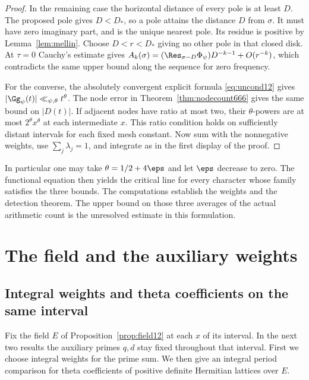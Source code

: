 \documentclass[a4paper,11pt]{article}
\theoremstyle{definition}
\theoremstyle{remark}
\numberwithin{equation}{section}
\begin{document}
\begin{proof}
In the remaining case the horizontal distance of every pole is
at least \(D\). The proposed pole gives \(D<D_*\), so a pole
attains the distance \(D\) from \(\sigma\). It must have zero
imaginary part, and is the unique nearest pole. Its residue is
positive by Lemma~\ref{lem:mellin}. Choose \(D<r<D_*\) giving
no other pole in that closed disk. At \(\tau=0\) Cauchy's
estimate gives \(A_k(\sigma)=(\Res_{\sigma-D}\Phi_\psi)D^{-k-1}
+O(r^{-k})\), which contradicts the same upper bound along the
sequence for zero frequency.

For the converse, the absolutely convergent explicit formula
\eqref{eq:uncond12} gives \(|\Gg_\psi(t)|\ll_{\psi,\theta}t^\theta\).
The node error in Theorem~\ref{thm:nodecount666} gives the same
bound on \(|D(t)|\). If adjacent nodes have ratio at most two,
their \(\theta\)-powers are at most \(2^\theta x^\theta\) at each
intermediate \(x\). This ratio condition holds on sufficiently
distant intervals for each fixed mesh constant. Now sum with the
nonnegative weights, use \(\sum_j\lambda_j=1\), and integrate
as in the first display of the proof.
\end{proof}

In particular one may take \(\theta=1/2+4\eps\) and let \(\eps\)
decrease to zero. The functional equation then yields the critical
line for every character whose family satisfies the three bounds.
The computations establish the weights and the detection theorem.
The upper bound on those three averages of the actual arithmetic
count is the unresolved estimate in this formulation.

\section{The field and the auxiliary weights}\label{nav:g-I-1}

\subsection{Integral weights and theta coefficients on the same interval}\label{nav:II-04}
\label{sec:period14}

Fix the field \(E\) of Proposition~\ref{prop:field12} at each \(x\) of its interval. In the next two results the auxiliary primes \(q,d\) stay fixed throughout that interval. First we choose integral weights for the prime sum. We then give an integral period comparison for theta coefficients of positive definite Hermitian lattices over \(E\).
\end{document}
